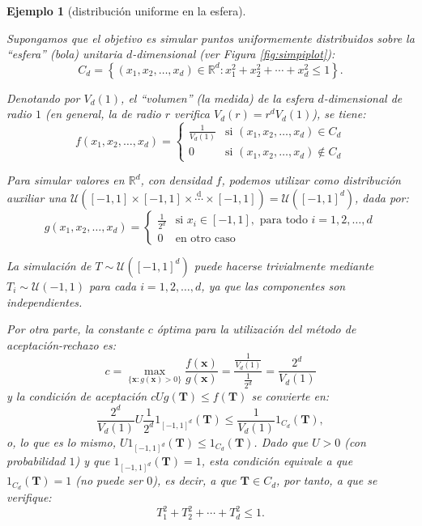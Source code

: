 \documentclass[
  spanish,
  10pt,
]{book}
\renewcommand{\mathbf}[1]{\symbf{#1}}
\theoremstyle{break}
\newtheorem{example}{Ejemplo}[chapter]
\theoremstyle{nonumberplain}
\begin{document}
\begin{example}[distribución uniforme en la esfera]
\protect\hypertarget{exm:ar-esfera}{}\label{exm:ar-esfera}

Supongamos que el objetivo es simular puntos uniformemente distribuidos sobre la ``esfera'' (bola) unitaria \(d\)-dimensional (ver Figura \ref{fig:simpiplot}):
\[C_d= \left\{  \left( x_1, x_2, \ldots, x_d \right) \in \mathbb{R}^d
: x_1^2 + x_2^2 + \cdots + x_d^2 \leq1 \right\}.\]

Denotando por \(V_d (1)\), el ``volumen'' (la medida) de la
esfera \(d\)-dimensional de radio \(1\) (en general, la de radio \(r\)
verifica \(V_d\left( r\right) = r^d V_d (1)\)), se tiene:
\[f\left( x_1,x_2,\ldots,x_d\right) = \left\{
\begin{array}{ll}
\frac{1}{V_d (1)  } & \text{si } \left( x_1, x_2, \ldots ,x_d\right)  \in C_d\\
0 & \text{si } \left( x_1,x_2,\ldots,x_d\right)  \notin C_d
\end{array} \right.\]

Para simular valores en \(\mathbb{R}^d\), con densidad \(f\),
podemos utilizar como distribución auxiliar una
\(\mathcal{U}\left( [-1, 1]  \times [-1, 1] \times \overset{\text{d}}{\cdots} \times [-1, 1] \right) = \mathcal{U}\left( [-1, 1]^d\right)\), dada por:
\[g\left( x_1,x_2,\ldots,x_d\right) = \left\{
\begin{array}{ll}
\frac{1}{2^d} & \text{si } x_i \in [-1, 1], \text{ para todo }
i=1,2,\ldots,d\\
0 &  \text{en otro caso}
\end{array}\right.\]

La simulación de \(T \sim \mathcal{U}\left( [-1, 1]^d \right)\) puede hacerse trivialmente mediante \(T_i \sim \mathcal{U}\left( -1, 1 \right)\) para cada \(i=1,2,\ldots,d\), ya que las componentes son independientes.

Por otra parte, la constante \(c\) óptima para la utilización del método de aceptación-rechazo es:
\[c= \max_{\{\mathbf{x}:g(\mathbf{x}) > 0\}}
\frac{f(\mathbf{x})}{g(\mathbf{x})}
= \frac{\frac{1}{V_d (1)}}{\frac{1}{2^d}}
= \frac{2^d}{V_d (1)}\]
y la condición de aceptación \(cUg(\mathbf{T}) \leq f(\mathbf{T})\) se convierte en:
\[\frac{2^d}{V_d (1)}U\frac{1}{2^d}1_{[-1, 1]^d}(\mathbf{T})  \leq\frac{1}{V_d (1)}1_{C_d}(\mathbf{T}),\]
o, lo que es lo mismo,
\(U 1_{[-1, 1]^d}(\mathbf{T}) \leq 1_{C_d}(\mathbf{T})\).
Dado que \(U > 0\) (con probabilidad \(1\)) y que \(1_{[-1, 1]^d}(\mathbf{T}) = 1\), esta condición equivale a que \(1_{C_d}(\mathbf{T}) = 1\) (no puede ser \(0\)), es decir, a que \(\mathbf{T} \in C_d\), por tanto, a que se verifique:
\[T_1^2 + T_2^2 + \cdots + T_d^2 \leq 1.\]


\end{example}
\end{document}
